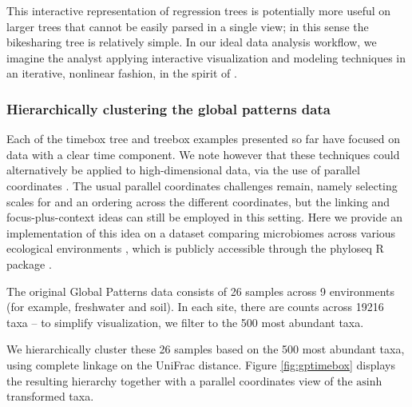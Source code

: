 This interactive representation of regression trees is potentially more
useful on larger trees that cannot be easily parsed in a single view; in
this sense the bikesharing tree is relatively simple. In our ideal data
analysis workflow, we imagine the analyst applying interactive
visualization and modeling techniques in an iterative, nonlinear
fashion, in the spirit of \citep{de2003visual}.

\subsubsection{Hierarchically clustering the global patterns data}\label{global_patterns}

Each of the timebox tree and treebox examples presented so far have
focused on data with a clear time component. We note however that these
techniques could alternatively be applied to high-dimensional data, via
the use of parallel coordinates \citep{inselberg1991parallel}. The usual
parallel coordinates challenges remain, namely selecting scales for and an
ordering across the different coordinates, but the linking and
focus-plus-context ideas can still be employed in this setting. Here we
provide an implementation of this idea on a dataset comparing microbiomes across
various ecological environments \citep{caporaso2011global}, which is publicly
accessible through the phyloseq R package \citep{mcmurdie2013phyloseq}.

The original Global Patterns data consists of 26 samples across 9
environments (for example, freshwater and soil). In each site, there are
counts across 19216 taxa -- to simplify visualization, we filter to the
500 most abundant taxa.

We hierarchically cluster these 26 samples based on the 500 most
abundant taxa, using complete linkage on the UniFrac distance. Figure
\ref{fig:gptimebox} displays the resulting hierarchy together with a
parallel coordinates view of the \(\text{asinh}\) transformed taxa.

